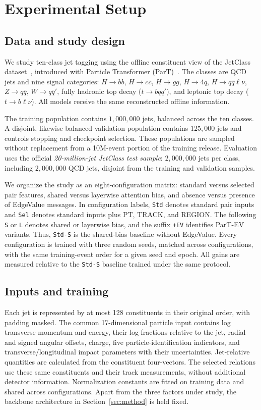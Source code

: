 \section{Experimental Setup}
\label{sec:experiments}

\subsection{Data and study design}
We study ten-class jet tagging using the offline constituent view of the
JetClass dataset~\citep{JetClass}, introduced with Particle Transformer
(ParT)~\citep{Qu2022ParticleTransformer}.
The classes are QCD jets and nine signal categories:
$H\to b\bar b$, $H\to c\bar c$, $H\to gg$, $H\to4q$, $H\to q\bar q\ell\nu$,
$Z\to q\bar q$, $W\to q\bar q'$, fully hadronic top decay ($t\to bqq'$),
and leptonic top decay ($t\to b\ell\nu$).
All models receive the same reconstructed offline information.

The training population contains $1{,}000{,}000$ jets, balanced across the ten
classes. A disjoint, likewise balanced validation population contains
$125{,}000$ jets and controls stopping and checkpoint selection.
These populations are sampled without replacement from a 10M-event portion
of the training release. Evaluation uses the official
\emph{20-million-jet JetClass test sample}: $2{,}000{,}000$ jets per class, including
$2{,}000{,}000$ QCD jets, disjoint from the training and validation samples.

We organize the study as an eight-configuration matrix: standard versus selected
pair features, shared versus layerwise attention bias, and absence versus presence
of EdgeValue messages.
In configuration labels, \texttt{Std} denotes standard pair inputs and
\texttt{Sel} denotes standard inputs plus PT, TRACK, and REGION.
The following \texttt{S} or \texttt{L} denotes shared or layerwise bias,
and the suffix \texttt{+EV} identifies ParT-EV variants. Thus,
\texttt{Std-S} is the shared-bias baseline without EdgeValue.
Every configuration is trained with three random seeds, matched across
configurations, with the same training-event order for a given seed and epoch.
All gains are measured relative to the \texttt{Std-S} baseline trained under
the same protocol.

\subsection{Inputs and training}
Each jet is represented by at most 128 constituents in their original order,
with padding masked. The common 17-dimensional particle input
contains log transverse momentum and energy, their log fractions relative to
the jet, radial and signed angular offsets, charge, five
particle-identification indicators, and transverse/longitudinal impact parameters
with their uncertainties. Jet-relative quantities are calculated from the
constituent four-vectors. The selected relations use these same constituents
and their track measurements, without additional detector information.
Normalization constants are fitted on training data and shared across
configurations. Apart from the three factors under study, the backbone
architecture in Section~\ref{sec:method} is held fixed.

